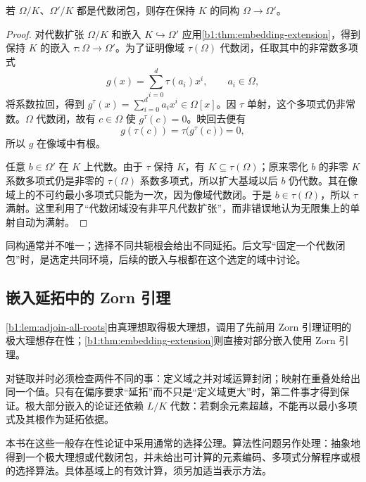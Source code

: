 \begin{proposition}\label{b1:prop:algebraic-closure-unique}
	若 \(\Omega/K\)、\(\Omega'/K\) 都是代数闭包，则存在保持 \(K\) 的同构 \(\Omega\rightarrow\Omega'\)。
\end{proposition}
\begin{proof}
	对代数扩张 \(\Omega/K\) 和嵌入 \(K\hookrightarrow\Omega'\) 应用\cref{b1:thm:embedding-extension}，得到保持 \(K\) 的嵌入 \(\tau:\Omega\rightarrow\Omega'\)。为了证明像域 \(\tau(\Omega)\) 代数闭，任取其中的非常数多项式
	\[
		g(x)=\sum_{i=0}^d\tau(a_i)x^i, \qquad a_i\in\Omega,
	\]
	将系数拉回，得到 \(g^\tau(x)=\sum_{i=0}^d a_ix^i\in\Omega[x]\)。因 \(\tau\) 单射，这个多项式仍非常数。\(\Omega\) 代数闭，故有 \(c\in\Omega\) 使 \(g^\tau(c)=0\)。映回去便有
	\[
		g(\tau(c))=\tau\bigl(g^\tau(c)\bigr)=0,
	\]
	所以 \(g\) 在像域中有根。

	任意 \(b\in\Omega'\) 在 \(K\) 上代数。由于 \(\tau\) 保持 \(K\)，有 \(K\subseteq\tau(\Omega)\)；原来零化 \(b\) 的非零 \(K\) 系数多项式仍是非零的 \(\tau(\Omega)\) 系数多项式，所以扩大基域以后 \(b\) 仍代数。其在像域上的不可约最小多项式只能为一次，因为像域代数闭。于是 \(b\in\tau(\Omega)\)，所以 \(\tau\) 满射。这里利用了“代数闭域没有非平凡代数扩张”，而非错误地认为无限集上的单射自动为满射。
\end{proof}
同构通常并不唯一；选择不同共轭根会给出不同延拓。后文写“固定一个代数闭包”时，是选定共同环境，后续的嵌入与根都在这个选定的域中讨论。

\subsection{嵌入延拓中的 Zorn 引理}
\label{b1:subsec:1502:03}

\cref{b1:lem:adjoin-all-roots}由真理想取得极大理想，调用了先前用 Zorn 引理证明的极大理想存在性；\cref{b1:thm:embedding-extension}则直接对部分嵌入使用 Zorn 引理。

\ProseParagraphBreak
对链取并时必须检查两件不同的事：定义域之并对域运算封闭；映射在重叠处给出同一个值。只有在偏序要求“延拓”而不只是“定义域更大”时，第二件事才得到保证。极大部分嵌入的论证还依赖 \(L/K\) 代数：若剩余元素超越，不能再以最小多项式及其根作为延拓依据。

\ProseParagraphBreak
本书在这些一般存在性论证中采用通常的选择公理。算法性问题另作处理：抽象地得到一个极大理想或代数闭包，并未给出可计算的元素编码、多项式分解程序或根的选择算法。具体基域上的有效计算，须另加适当表示方法。
